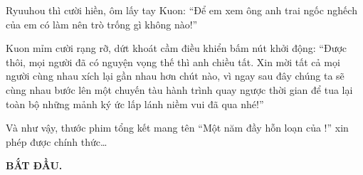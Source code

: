 \documentclass[../main.tex]{subfiles}
\begin{document}
Ryuuhou thì cười hiền, ôm lấy tay Kuon: ``Để em xem ông anh trai ngốc nghếch của em có làm nên trò trống gì không nào!''

Kuon mỉm cười rạng rỡ, dứt khoát cầm điều khiển bấm nút khởi động: ``Được thôi, mọi người đã có nguyện vọng thế thì anh chiều tất. Xin mời tất cả mọi người cùng nhau xích lại gần nhau hơn chút nào, vì ngay sau đây chúng ta sẽ cùng nhau bước lên một chuyến tàu hành trình quay ngược thời gian để tua lại toàn bộ những mảnh ký ức lấp lánh niềm vui đã qua nhé!''


Và như vậy, thước phim tổng kết mang tên ``Một năm đầy hỗn loạn của \hll!'' xin phép được chính thức\dots

\begin{center}
  \textbf{\huge BẮT ĐẦU.}
\end{center}
\end{document}
